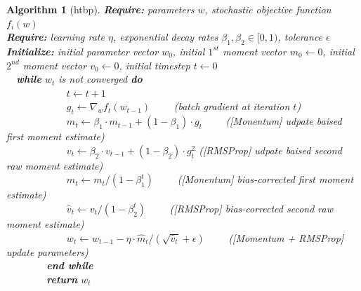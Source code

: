 \documentclass[letterpaper,11 pt]{article}
\newtheorem{algorithm}{Algorithm}
\begin{document}
\begin{center}
\begin{algorithm}[htbp]
\caption{The ADAM algorithm computes a batch stochastic gradient. UPDATE}
\label{alg:adam}

{\bf Require:}  parameters $w$, stochastic objective function $f_{i}(w)$ \\
{\bf Require:} learning rate $\eta$, exponential decay rates $\beta_1, \beta_2 \in [0,1)$, tolerance $\epsilon$ \\
{\bf Initialize:} initial parameter vector $w_{0}$, initial $1^{st}$ moment vector $m_0 \leftarrow 0$, initial $2^{nd}$ moment vector $v_0 \leftarrow 0$, initial timestep $t \leftarrow 0$ \\
\-\ \-\ {\bf while} $w_t$ is not converged {\bf do} \\
\-\ \-\ \-\ \-\ \-\ \-\ \-\ \-\ \-\ \-\ \-\ \-\   $t \leftarrow t+1$ \\
\-\ \-\ \-\ \-\ \-\ \-\ \-\ \-\ \-\ \-\ \-\ \-\   $g_{t} \leftarrow \nabla_{w} f_{t} (w_{t-1}) $ \-\ \-\ \-\ \-\  (\textit{batch gradient at iteration $t$}) \\
\-\ \-\ \-\ \-\ \-\ \-\ \-\ \-\ \-\ \-\ \-\ \-\   $m_{t} \leftarrow \beta_{1} \cdot m_{t-1} + (1 - \beta_{1}) \cdot g_{t}$ \-\ \-\ \-\ \-\  (\textit{[Monentum] udpate baised first moment estimate}) \\
\-\ \-\ \-\ \-\ \-\ \-\ \-\ \-\ \-\ \-\ \-\ \-\   $v_{t} \leftarrow \beta_{2} \cdot v_{t-1} + (1 - \beta_{2}) \cdot g_{t}^{2}$ (\textit{[RMSProp] udpate baised second raw moment estimate})  \\
\-\ \-\ \-\ \-\ \-\ \-\ \-\ \-\ \-\ \-\ \-\ \-\    $\hat{m}_{t} \leftarrow m_{t} / (1 - \beta_{1}^t) $ \-\ \-\ \-\ \-\  (\textit{[Monentum]  bias-corrected first moment estimate}) \\
\-\ \-\ \-\ \-\ \-\ \-\ \-\ \-\ \-\ \-\ \-\ \-\    $\hat{v}_{t} \leftarrow v_{t} / (1 - \beta_{2}^t) $ \-\ \-\ \-\ \-\  (\textit{[RMSProp] bias-corrected second raw moment estimate})  \\
\-\ \-\ \-\ \-\ \-\ \-\ \-\ \-\ \-\ \-\ \-\ \-\   $w_{t} \leftarrow w_{t-1} - \eta \cdot \hat{m}_{t} / ( \sqrt{\hat{v}_{t}} + \epsilon ) $ \-\ \-\ \-\ \-\  (\textit{[Momentum + RMSProp] update parameters}) \\
\-\ \-\ \-\ \-\ \-\ \-\ \-\ \-\  {\bf end while} \\
\-\ \-\ \-\ \-\ \-\ \-\ \-\ \-\  {\bf return} $w_{t}$ \\

\end{algorithm}

\end{center}
\end{document}
